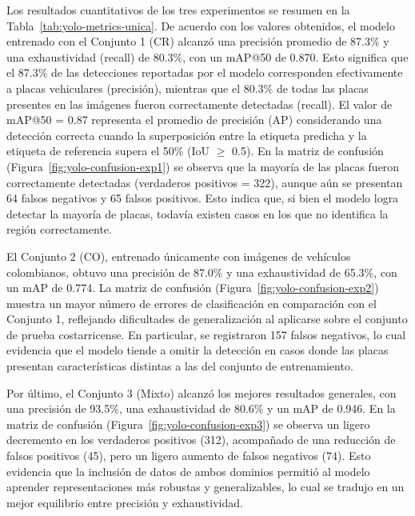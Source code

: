 Los resultados cuantitativos de los tres experimentos se resumen en la Tabla~\ref{tab:yolo-metrics-unica}. 
De acuerdo con los valores obtenidos, el modelo entrenado con el Conjunto 1 (CR)
alcanzó una precisión promedio de 87.3\% y una exhaustividad (recall) de 80.3\%, con un mAP@50 de 0.870. 
Esto significa que el 87.3\% de las detecciones reportadas por el modelo corresponden efectivamente
a placas vehiculares (precisión), mientras que el 80.3\% de todas las placas presentes en las imágenes
fueron correctamente detectadas (recall).
El valor de mAP@50 = 0.87 representa el promedio de precisión (AP)
considerando una detección correcta cuando la superposición entre la etiqueta predicha 
y la etiqueta de referencia supera el 50\% (IoU $\geq$ 0.5).
En la matriz de confusión (Figura~\ref{fig:yolo-confusion-exp1})
se observa que la mayoría de las placas fueron correctamente detectadas (verdaderos positivos = 322),
aunque aún se presentan 64 falsos negativos y 65 falsos positivos. 
Esto indica que, si bien el modelo logra detectar la mayoría de placas,
todavía existen casos en los que no identifica la región correctamente.

El Conjunto 2 (CO), entrenado únicamente con imágenes de vehículos colombianos,
obtuvo una precisión de 87.0\% y una exhaustividad de 65.3\%, con un mAP de 0.774. 
La matriz de confusión (Figura~\ref{fig:yolo-confusion-exp2})
muestra un mayor número de errores de clasificación en comparación con el Conjunto 1, 
reflejando dificultades de generalización al aplicarse sobre el conjunto de prueba costarricense. 
En particular, se registraron 157 falsos negativos,
lo cual evidencia que el modelo tiende a omitir la detección en 
casos donde las placas presentan características distintas a las del conjunto de entrenamiento.

Por último, el Conjunto 3 (Mixto) alcanzó los mejores resultados generales,
con una precisión de 93.5\%, una exhaustividad de 80.6\% y un mAP de 0.946. 
En la matriz de confusión (Figura~\ref{fig:yolo-confusion-exp3})
se observa un ligero decremento en los verdaderos positivos (312),
acompañado de una reducción de falsos positivos (45), pero un ligero aumento de falsos negativos (74). 
Esto evidencia que la inclusión de datos de ambos dominios permitió al modelo aprender
representaciones más robustas y generalizables,
lo cual se tradujo en un mejor equilibrio entre precisión y exhaustividad.

